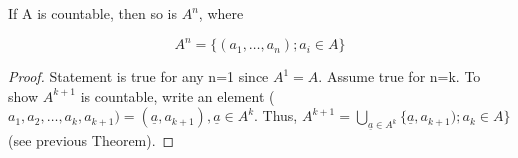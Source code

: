 \documentclass[11pt,fleqn]{book} %
\begin{document}
\begin{theorem}
	If A is countable, then so is $A^n$, where 

	$$A^n = \{ (a_1, \dots, a_n); a_i \in A\} $$
\end{theorem}

\begin{proof}
	Statement is true for any n=1 since $A^1 = A$. Assume true for n=k. To show $A^{k+1}$ is countable, write an element ($a_1, a_2, \dots, a_k, a_{k+1}) = (\underline{a}, a_{k+1}), \underline{a} \in A^k$. Thus, $A^{k+1} = \bigcup\limits_{\underline{a}\in A^k} \{\underline{a}, a_{k+1}); a_k \in A\} $ (see previous Theorem).
\end{proof}









\end{document}
